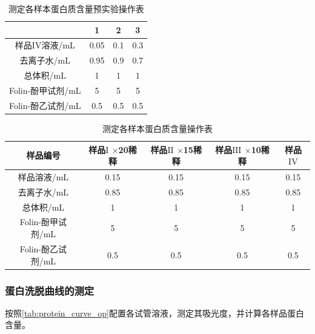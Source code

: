 \begin{table}[H]
\centering
\caption{测定各样本蛋白质含量预实验操作表}
\label{tab:protein_op_pre_tabel}
\begin{tabular}{@{}cccc@{}}
\toprule
              & 1    & 2   & 3   \\ \midrule
样品IV溶液/mL     & 0.05 & 0.1 & 0.3 \\
去离子水/mL       & 0.95 & 0.9 & 0.7 \\
总体积/mL        & 1    & 1   & 1   \\
Folin-酚甲试剂/mL & 5    & 5   & 5   \\
Folin-酚乙试剂/mL & 0.5  & 0.5 & 0.5 \\ \bottomrule
\end{tabular}
\end{table}

\begin{table}[H]
\centering
\caption{测定各样本蛋白质含量操作表}
\label{tab:protein_op_table}
\begin{tabular}{@{}ccccc@{}}
\toprule
样品编号          & 样品$\mathrm{I}$ $\times$20稀释 & 样品$\mathrm{II}$ $\times$15稀释 & 样品$\mathrm{III}$ $\times$10稀释 & 样品$\mathrm{IV}$ \\ \midrule
样品溶液/mL        & 0.15     & 0.15     & 0.15      & 0.15 \\
去离子水/mL        & 0.85     & 0.85     & 0.85      & 0.85 \\
总体积/mL         & 1        & 1        & 1         & 1    \\
Folin-酚甲试剂/mL  & 5        & 5        & 5         & 5    \\ 
Folin-酚乙试剂/mL     & 0.5      & 0.5      & 0.5       & 0.5  \\  \bottomrule
\end{tabular}
\end{table}

\subsubsection{蛋白洗脱曲线的测定}
按照\autoref{tab:protein_curve_op}配置各试管溶液，测定其吸光度，并计算各样品蛋白含量。

